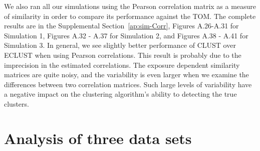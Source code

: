 We also ran all our simulations using the Pearson correlation matrix as a measure of similarity in order to compare its performance against the TOM. The complete results are in the Supplemental Section~\ref{ap:sim-Corr}, Figures A.26-A.31 for Simulation 1, Figures A.32 - A.37 for Simulation 2, and Figures A.38 - A.41 for Simulation 3. In general, we see slightly better performance of CLUST over ECLUST when using Pearson correlations.  This result is probably due to the imprecision in the estimated correlations.  The exposure dependent similarity matrices are quite noisy, and the variability is even larger when we examine the differences between two correlation matrices.  Such large levels of variability have a negative impact on the clustering algorithm's ability to detecting the true clusters.

\begin{comment}
\begin{figure}[h!]
	\centering
	\texttt{[image: figure6.eps]}
	\caption{Stability results from simulations 1, 2 and 3 for $SNR=1$, $\rho = 0.9$, and $\alpha_{j} \sim \tm{Unif}\left[1.9, 2.1\right]$. SEPARATE results are in pink, CLUST in green and ECLUST in blue.}
	\label{fig:sim-stability}
\end{figure}
\end{comment}



\section{Analysis of three data sets}

